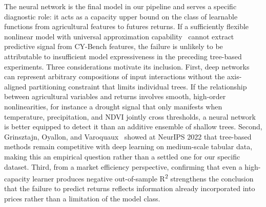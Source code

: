\documentclass[pdflatex,sn-mathphys-num, oneside, 11pt]{sn-jnl}%
\theoremstyle{thmstyleone}%
\theoremstyle{thmstyletwo}%
\theoremstyle{thmstylethree}%
\begin{document}
The neural network is the final model in our pipeline and serves a specific diagnostic role: it acts as a capacity upper bound on the class of learnable functions from agricultural features to futures returns. If a sufficiently flexible nonlinear model with universal approximation capability~\cite{bib_goodfellow} cannot extract predictive signal from CY-Bench features, the failure is unlikely to be attributable to insufficient model expressiveness in the preceding tree-based experiments. Three considerations motivate its inclusion. First, deep networks can represent arbitrary compositions of input interactions without the axis-aligned partitioning constraint that limits individual trees. If the relationship between agricultural variables and returns involves smooth, high-order nonlinearities, for instance a drought signal that only manifests when temperature, precipitation, and NDVI jointly cross thresholds, a neural network is better equipped to detect it than an additive ensemble of shallow trees. Second, Grinsztajn, Oyallon, and Varoquaux~\cite{bib27} showed at NeurIPS 2022 that tree-based methods remain competitive with deep learning on medium-scale tabular data, making this an empirical question rather than a settled one for our specific dataset. Third, from a market efficiency perspective, confirming that even a high-capacity learner produces negative out-of-sample R\textsuperscript{2} strengthens the conclusion that the failure to predict returns reflects information already incorporated into prices rather than a limitation of the model class.\\
\end{document}
